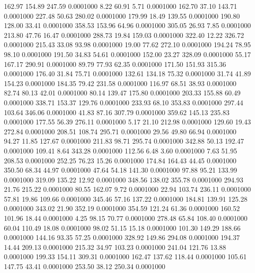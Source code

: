  162.97  154.89  247.59   0.0001000
   8.22   60.91    5.71   0.0001000
 162.70   37.10  143.71   0.0001000
 227.48   50.63  280.02   0.0001000
 179.99   18.49  139.55   0.0001000
 190.80  128.00   33.41   0.0001000
 358.53  153.96   64.96   0.0001000
 305.05   26.93    7.85   0.0001000
 213.80   47.76   16.47   0.0001000
 288.73   19.84  159.03   0.0001000
 322.40   12.22  326.72   0.0001000
 215.43   33.08   93.98   0.0001000
  19.00   77.62  272.10   0.0001000
 194.24   78.95   98.10   0.0001000
 191.50   34.83   54.61   0.0001000
 152.00   23.27  328.09   0.0001000
  55.17  167.17  290.91   0.0001000
  89.79   77.93   62.35   0.0001000
 171.50  151.93  315.36   0.0001000
 176.40   31.84   75.71   0.0001000
 132.61  134.18   75.32   0.0001000
  31.74   41.89  154.23   0.0001000
 184.35   79.42  231.58   0.0001000
 116.97   68.51   38.93   0.0001000
  82.74   80.13   42.01   0.0001000
  80.14  139.47  175.80   0.0001000
 203.33  155.88   60.49   0.0001000
 338.71  153.37  129.76   0.0001000
 233.93   68.10  353.83   0.0001000
 297.44  103.64  346.06   0.0001000
  41.83   87.16  307.79   0.0001000
 359.62  145.13  235.83   0.0001000
 177.55   56.39  276.11   0.0001000
   5.17   21.10  212.98   0.0001000
 129.60   19.43  272.84   0.0001000
 208.51  108.74  295.71   0.0001000
  29.56   49.80   66.94   0.0001000
  94.27   11.85  127.67   0.0001000
 211.83   98.71  295.74   0.0001000
 342.88   50.13  192.47   0.0001000
 109.41    8.64  343.28   0.0001000
 112.56    6.48    3.60   0.0001000
   7.63   51.95  208.53   0.0001000
 252.25   76.23   15.26   0.0001000
 174.84  164.43   44.45   0.0001000
 350.50   68.34   44.97   0.0001000
  47.64   54.18  141.30   0.0001000
  97.88   95.21  133.99   0.0001000
 319.09  135.22   12.92   0.0001000
 348.56  138.02  355.78   0.0001000
 294.93   21.76  215.22   0.0001000
  80.55  162.07    9.72   0.0001000
  22.94  103.74  236.11   0.0001000
  57.81   19.86  109.66   0.0001000
 345.46   57.16  137.22   0.0001000
 184.81  139.91  125.28   0.0001000
 343.02   21.90  352.19   0.0001000
 354.59  121.24   61.36   0.0001000
 160.52  101.96   18.44   0.0001000
   4.25   98.15   70.77   0.0001000
 278.48   65.84  108.40   0.0001000
  60.04  110.49   18.08   0.0001000
  98.02   51.15   15.18   0.0001000
 101.30  149.29  188.66   0.0001000
 144.16   93.35   57.25   0.0001000
 328.92  149.86  294.08   0.0001000
 194.37   14.44  209.13   0.0001000
 215.32   34.97  103.23   0.0001000
 241.04  121.76   13.88   0.0001000
 199.33  154.11  309.31   0.0001000
 162.47  137.62  118.44   0.0001000
 105.61  147.75   43.41   0.0001000
 253.50   38.12  250.34   0.0001000
